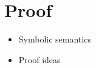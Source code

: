 \section{Proof}
\label{sec:proof}

\begin{itemize}
    \item Symbolic semantics
    \item Proof ideas
\end{itemize}